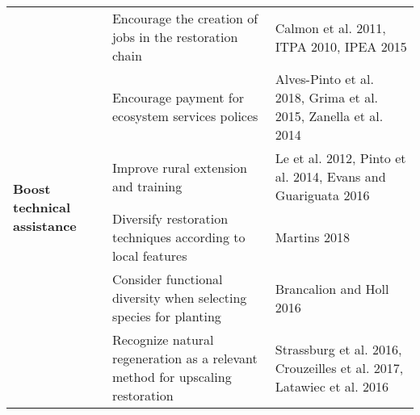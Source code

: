 \begin{tabular}{|m{5.2cm}|m{5.5cm}|m{4.5cm}|}
\cline{2-3}
&Encourage the creation of jobs in the restoration chain  &Calmon et al. 2011, ITPA 2010, IPEA 2015 \\
\cline{2-3}
&Encourage payment for ecosystem services polices   &Alves-Pinto et al. 2018, Grima et al. 2015, Zanella et al. 2014 \\
\cline{1-3}
\multirow{2}{*}{\bfseries Boost technical assistance}   &Improve rural extension and training  &Le et al. 2012, Pinto et al. 2014, Evans and Guariguata 2016  \\
\cline{2-3}
&Diversify restoration techniques according to local features  &Martins 2018  \\
\cline{2-3}
&Consider functional diversity when selecting species for planting  &Brancalion and Holl 2016  \\
\cline{2-3}
&Recognize natural regeneration as a relevant method for upscaling restoration  &Strassburg et al. 2016, Crouzeilles et al. 2017, Latawiec et al. 2016  \\
\hline
\end{tabular}




